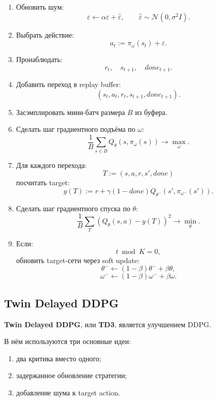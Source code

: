 \documentclass[12pt,a4paper]{article}
\begin{document}
\begin{enumerate}
    \item Обновить шум:
    \[
    \varepsilon
    \leftarrow
    \alpha\varepsilon+\hat\varepsilon,
    \qquad
    \hat\varepsilon\sim\mathcal N(0,\sigma^2 I).
    \]

    \item Выбрать действие:
    \[
    a_t
    :=
    \pi_\omega(s_t)+\varepsilon.
    \]

    \item Пронаблюдать:
    \[
    r_t,\quad s_{t+1},\quad done_{t+1}.
    \]

    \item Добавить переход в replay buffer:
    \[
    (s_t,a_t,r_t,s_{t+1},done_{t+1}).
    \]

    \item Засэмплировать мини-батч размера $B$ из буфера.

    \item Сделать шаг градиентного подъёма по $\omega$:
    \[
    \frac{1}{B}
    \sum_{s\in B}
    Q_\theta(s,\pi_\omega(s))
    \to
    \max_\omega.
    \]

    \item Для каждого перехода:
    \[
    T:=(s,a,r,s',done)
    \]
    посчитать target:
    \[
    y(T)
    :=
    r
    +
    \gamma(1-done)
    Q_{\theta^-}
    \left(
    s',
    \pi_{\omega^-}(s')
    \right).
    \]

    \item Сделать шаг градиентного спуска по $\theta$:
    \[
    \frac{1}{B}
    \sum_T
    \left(
    Q_\theta(s,a)-y(T)
    \right)^2
    \to
    \min_\theta.
    \]

    \item Если:
    \[
    t\bmod K=0,
    \]
    обновить target-сети через soft update:
    \[
    \theta^-
    \leftarrow
    (1-\beta)\theta^-+\beta\theta,
    \]
    \[
    \omega^-
    \leftarrow
    (1-\beta)\omega^-+\beta\omega.
    \]
\end{enumerate}

\subsection{Twin Delayed DDPG}

\textbf{Twin Delayed DDPG}, или \textbf{TD3}, является улучшением DDPG.

В нём используются три основные идеи:

\begin{enumerate}
    \item два критика вместо одного;
    \item задержанное обновление стратегии;
    \item добавление шума к target action.
\end{enumerate}
\end{document}
